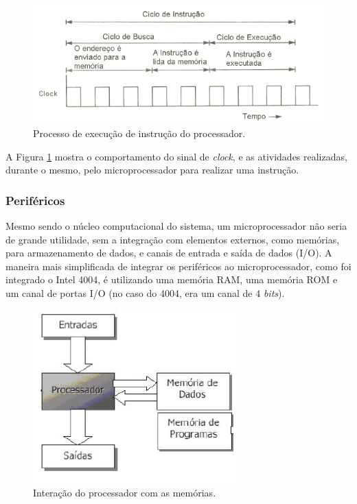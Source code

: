 \begin{figure}[ht]
    \begin{center}
    \includegraphics{figuras/clock.PNG}
    \end{center}
    \caption[Sequencia de instrução]{Processo de execução de instrução do processador.}
    \label{clock}
\end{figure}

A Figura \ref{clock} mostra o comportamento do sinal de \textit{clock}, e as atividades realizadas, durante o mesmo, pelo microprocessador para realizar uma instrução.

\subsubsection{Periféricos}

Mesmo sendo o núcleo computacional do sistema, um microprocessador não seria de grande utilidade, sem a integração com elementos externos, como memórias, para armazenamento de dados, e canais de entrada e saída de dados (\ac{I/O}). A maneira mais simplificada de integrar os periféricos ao microprocessador, como foi integrado o Intel 4004, é utilizando uma memória \ac{RAM}, uma memória \ac{ROM} e um canal de portas \ac{I/O} (no caso do 4004, era um canal de 4 \textit{bits}).

\begin{figure}[ht]
    \begin{center}
    \includegraphics{figuras/processor_periph.PNG}
    \end{center}
    \caption[Periféricos do processador]{Interação do processador com as memórias.}
    \label{perifericos}
\end{figure}

